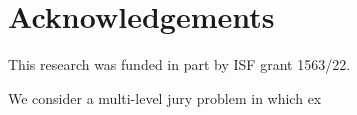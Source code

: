 \documentclass[letterpaper]{article} %
\begin{document}



%
\newpage
\section*{Acknowledgements}
This research was funded in part by ISF grant 1563/22.

We consider a multi-level jury problem in which ex
\clearpage

\end{document}
